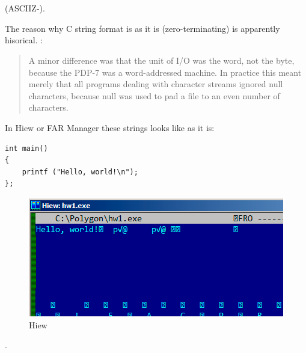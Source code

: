 \section{}

\label{C_strings}
(\ac{ASCIIZ}-).

{The reason why C string format is as it is (zero-terminating) is apparently hisorical}.
 \cite{Ritchie79} :

\begin{framed}
\begin{quotation}
A minor difference was that the unit of I/O was the word, not the byte, because the PDP-7 was a word-addressed
machine. In practice this meant merely that all programs dealing with character streams ignored null
characters, because null was used to pad a file to an even number of characters.
\end{quotation}
\end{framed}

{In Hiew or FAR Manager these strings looks like as it is}:

\begin{lstlisting}
int main()
{
	printf ("Hello, world!\n");
};
\end{lstlisting}

\begin{figure}[H]
\centering
\includegraphics[scale=0.66]{digging_into_code/strings/C-string.png}
\caption{Hiew}
\end{figure}

.

